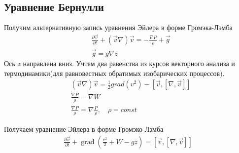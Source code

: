 \subsection{Уравнение Бернулли}
Получим альтернативную запись уравнения Эйлера в форме Громэка-Лэмба
\begin{align*}
&\frac { \partial \vec { v } } { \partial t } + ( \vec { v } \nabla ) \vec { v } = - \frac { \nabla P } { \rho } + \vec { g } \\
&\vec { g } = g \nabla z
\end{align*}
Ось $z$ направлена вниз. Учтем два равенства из курсов векторного анализа и термодинамики(для равновестных обратимых изобарических процессов).
\begin{align*}
&(\vec {v} \nabla ) \vec { v } = \frac { 1 } { 2 } g r a d \left( v ^ { 2 } \right) - [ \vec { v } , [\nabla , \vec { v } ]] \\
&\frac { \nabla P } { \rho } = \nabla W \\
&\frac { \nabla P } { \rho } = \nabla \frac { P } { \rho } , \quad \rho = const
\end{align*}

Получаем уравнение Эйлера в форме Громэко-Лэмба
\begin{align*}
\frac { \partial \vec { v } } { \partial t } + \operatorname { grad } \left( \frac { v ^ { 2 } } { 2 } + W - g z \right) = [ \vec { v } , [\nabla , \vec { v } ]]
\end{align*}

